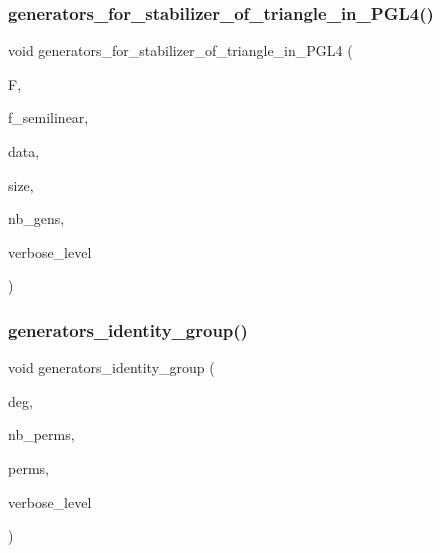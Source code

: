 \subsubsection{\texorpdfstring{generators\+\_\+for\+\_\+stabilizer\+\_\+of\+\_\+triangle\+\_\+in\+\_\+\+P\+G\+L4()}{generators\_for\_stabilizer\_of\_triangle\_in\_PGL4()}}
{\footnotesize\ttfamily void generators\+\_\+for\+\_\+stabilizer\+\_\+of\+\_\+triangle\+\_\+in\+\_\+\+P\+G\+L4 (\begin{DoxyParamCaption}\item[{\mbox{\hyperlink{classfinite__field}{finite\+\_\+field}} $\ast$}]{F,  }\item[{\mbox{\hyperlink{galois_8h_a09fddde158a3a20bd2dcadb609de11dc}{I\+NT}}}]{f\+\_\+semilinear,  }\item[{\mbox{\hyperlink{galois_8h_a09fddde158a3a20bd2dcadb609de11dc}{I\+NT}} $\ast$\&}]{data,  }\item[{\mbox{\hyperlink{galois_8h_a09fddde158a3a20bd2dcadb609de11dc}{I\+NT}} \&}]{size,  }\item[{\mbox{\hyperlink{galois_8h_a09fddde158a3a20bd2dcadb609de11dc}{I\+NT}} \&}]{nb\+\_\+gens,  }\item[{\mbox{\hyperlink{galois_8h_a09fddde158a3a20bd2dcadb609de11dc}{I\+NT}}}]{verbose\+\_\+level }\end{DoxyParamCaption})}

\mbox{\label{group__generators_8_c_ad146821a32bde7901a7c78a942843b6d}} 
\subsubsection{\texorpdfstring{generators\+\_\+identity\+\_\+group()}{generators\_identity\_group()}}
{\footnotesize\ttfamily void generators\+\_\+identity\+\_\+group (\begin{DoxyParamCaption}\item[{\mbox{\hyperlink{galois_8h_a09fddde158a3a20bd2dcadb609de11dc}{I\+NT}}}]{deg,  }\item[{\mbox{\hyperlink{galois_8h_a09fddde158a3a20bd2dcadb609de11dc}{I\+NT}} \&}]{nb\+\_\+perms,  }\item[{\mbox{\hyperlink{galois_8h_a09fddde158a3a20bd2dcadb609de11dc}{I\+NT}} $\ast$\&}]{perms,  }\item[{\mbox{\hyperlink{galois_8h_a09fddde158a3a20bd2dcadb609de11dc}{I\+NT}}}]{verbose\+\_\+level }\end{DoxyParamCaption})}

